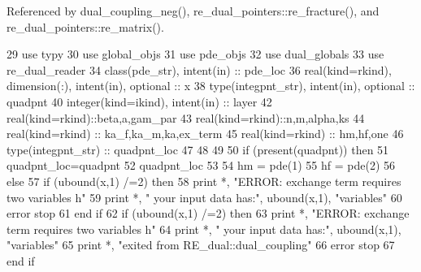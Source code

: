 Referenced by dual\+\_\+coupling\+\_\+neg(), re\+\_\+dual\+\_\+pointers\+::re\+\_\+fracture(), and re\+\_\+dual\+\_\+pointers\+::re\+\_\+matrix().


\begin{DoxyCode}
29       \textcolor{keywordtype}{use }typy
30       \textcolor{keywordtype}{use }global_objs
31       \textcolor{keywordtype}{use }pde_objs
32       \textcolor{keywordtype}{use }dual_globals
33       \textcolor{keywordtype}{use }re_dual_reader
34       \textcolor{keywordtype}{class}(pde_str), \textcolor{keywordtype}{intent(in)} :: pde\_loc
36       \textcolor{keywordtype}{real(kind=rkind)}, \textcolor{keywordtype}{dimension(:)}, \textcolor{keywordtype}{intent(in)}, \textcolor{keywordtype}{optional}    :: x
38       \textcolor{keywordtype}{type}(integpnt_str), \textcolor{keywordtype}{intent(in)}, \textcolor{keywordtype}{optional} :: quadpnt
40       \textcolor{keywordtype}{integer(kind=ikind)}, \textcolor{keywordtype}{intent(in)} :: layer
42       \textcolor{keywordtype}{real(kind=rkind)}::beta,a,gam\_par
43       \textcolor{keywordtype}{real(kind=rkind)}::n,m,alpha,ks
44       \textcolor{keywordtype}{real}(kind=rkind)                            :: ka\_f,ka\_m,ka,ex\_term
45       \textcolor{keywordtype}{real}(kind=rkind)                            :: hm,hf,one
46       \textcolor{keywordtype}{type}(integpnt_str) :: quadpnt\_loc     
47         
48        
49             
50       \textcolor{keywordflow}{if} (\textcolor{keyword}{present}(quadpnt)) \textcolor{keywordflow}{then}
51         quadpnt\_loc=quadpnt
52         quadpnt\_loc%
53 
54         hm = pde(1)%
55         hf = pde(2)%
56       \textcolor{keywordflow}{else}
57             \textcolor{keywordflow}{if} (ubound(x,1) /=2) \textcolor{keywordflow}{then}
58               print *, \textcolor{stringliteral}{"ERROR: exchange term requires two variables h"}
59               print *, \textcolor{stringliteral}{"       your input data has:"}, ubound(x,1), \textcolor{stringliteral}{"variables"}
60               error stop
61 \textcolor{keywordflow}{            end if}
62         \textcolor{keywordflow}{if} (ubound(x,1) /=2) \textcolor{keywordflow}{then}
63               print *, \textcolor{stringliteral}{"ERROR: exchange term requires two variables h"}
64               print *, \textcolor{stringliteral}{"       your input data has:"}, ubound(x,1), \textcolor{stringliteral}{"variables"}
65               print *, \textcolor{stringliteral}{"exited from RE\_dual::dual\_coupling"}
66               error stop
67 \textcolor{keywordflow}{           end if}

\end{DoxyCode}
